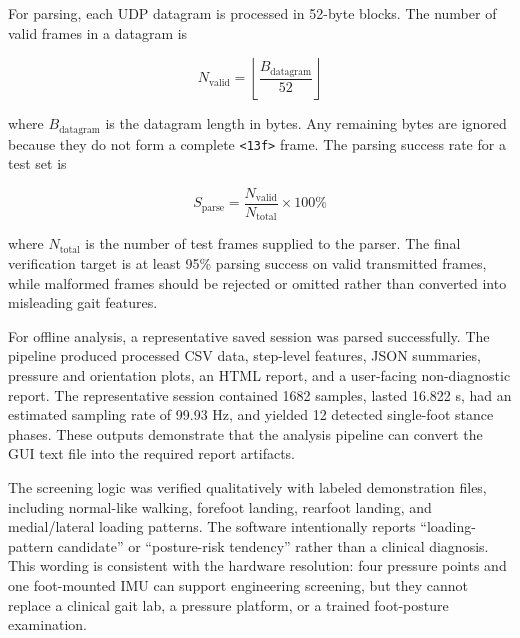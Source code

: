 For parsing, each UDP datagram is processed in 52-byte blocks. The number of valid frames in a datagram is

\begin{equation}
N_{\mathrm{valid}} =
\left\lfloor
\frac{B_{\mathrm{datagram}}}{52}
\right\rfloor
\label{eq:valid_frames}
\end{equation}

where $B_{\mathrm{datagram}}$ is the datagram length in bytes. Any remaining bytes are ignored because they do not form a complete \texttt{<13f>} frame. The parsing success rate for a test set is

\begin{equation}
S_{\mathrm{parse}} =
\frac{N_{\mathrm{valid}}}{N_{\mathrm{total}}}
\times 100\%
\label{eq:parse_success}
\end{equation}

where $N_{\mathrm{total}}$ is the number of test frames supplied to the parser. The final verification target is at least 95\% parsing success on valid transmitted frames, while malformed frames should be rejected or omitted rather than converted into misleading gait features.

For offline analysis, a representative saved session was parsed successfully. The pipeline produced processed CSV data, step-level features, JSON summaries, pressure and orientation plots, an HTML report, and a user-facing non-diagnostic report. The representative session contained 1682 samples, lasted 16.822 s, had an estimated sampling rate of 99.93 Hz, and yielded 12 detected single-foot stance phases. These outputs demonstrate that the analysis pipeline can convert the GUI text file into the required report artifacts.

The screening logic was verified qualitatively with labeled demonstration files, including normal-like walking, forefoot landing, rearfoot landing, and medial/lateral loading patterns. The software intentionally reports ``loading-pattern candidate'' or ``posture-risk tendency'' rather than a clinical diagnosis. This wording is consistent with the hardware resolution: four pressure points and one foot-mounted IMU can support engineering screening, but they cannot replace a clinical gait lab, a pressure platform, or a trained foot-posture examination.

